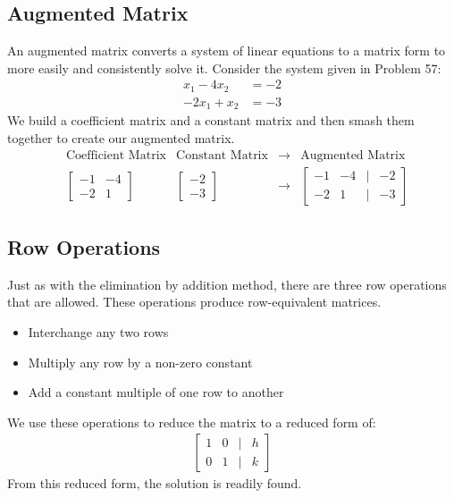 \documentclass[14pt]{extarticle}
\begin{document}
\subsection*{Augmented Matrix}
An augmented matrix converts a system of linear equations to a matrix form to more easily and consistently solve it. Consider the system given in Problem 57:
\begin{align*}
	x_1 - 4x_2 &= -2 \\
	-2x_1 + x_2 &= -3
\end{align*}
We build a coefficient matrix and a constant matrix and then smash them together to create our augmented matrix.
\begin{align*}
	&\text{Coefficient Matrix} &\text{Constant Matrix} & \to &\text{Augmented Matrix} \\
	&\begin{bmatrix}
		-1 & -4 \\
		-2 & 1
	\end{bmatrix} 
	&\begin{bmatrix}
		-2 \\
		-3
	\end{bmatrix}
	& \to &\begin{bmatrix}
		-1 & -4 & | & -2\\
		-2 & 1 & | & -3
	\end{bmatrix}
\end{align*}

\subsection*{Row Operations}
Just as with the elimination by addition method, there are three row operations that are allowed. These operations produce row-equivalent matrices.
\begin{itemize}
	\item Interchange any two rows
	\item Multiply any row by a non-zero constant
	\item Add a constant multiple of one row to another
\end{itemize}
We use these operations to reduce the matrix to a reduced form of:
\begin{align*}
	\begin{bmatrix}
		1 & 0 & | & h \\
		0 & 1 & | & k
	\end{bmatrix}
\end{align*}
From this reduced form, the solution is readily found.
\end{document}
